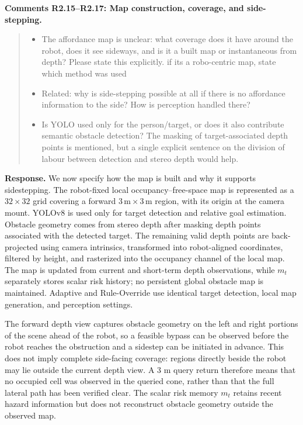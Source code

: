 \documentclass[letterpaper,11pt]{article}
\begin{document}
\noindent\textbf{Comments R2.15--R2.17: Map construction, coverage, and side-stepping.}
\begin{quote}\color{reviewgray}
\begin{itemize}[leftmargin=*,nosep,label={}]
\item[\textbf{R2.15.}] The affordance map is unclear: what coverage does it have around the robot, does it see sideways, and is it a built map or instantaneous from depth? Please state this explicitly. if its a robo-centric map, state which method was used
\item[\textbf{R2.16.}] Related: why is side-stepping possible at all if there is no affordance information to the side? How is perception handled there?
\item[\textbf{R2.17.}] Is YOLO used only for the person/target, or does it also contribute semantic obstacle detection? The masking of target-associated depth points is mentioned, but a single explicit sentence on the division of labour between detection and stereo depth would help.
\end{itemize}
\end{quote}
\noindent\textbf{Response.}
We now specify how the map is built and why it supports sidestepping. The robot-fixed local occupancy--free-space map is represented as a $32\times32$ grid covering a forward $3\,\mathrm{m}\times3\,\mathrm{m}$ region, with its origin at the camera mount. YOLOv8 is used only for target detection and relative goal estimation. Obstacle geometry comes from stereo depth after masking depth points associated with the detected target. The remaining valid depth points are back-projected using camera intrinsics, transformed into robot-aligned coordinates, filtered by height, and rasterized into the occupancy channel of the local map. The map is updated from current and short-term depth observations, while $m_t$ separately stores scalar risk history; no persistent global obstacle map is maintained. Adaptive and Rule-Override use identical target detection, local map generation, and perception settings.

The forward depth view captures obstacle geometry on the left and right portions of the scene ahead of the robot, so a feasible bypass can be observed before the robot reaches the obstruction and a sidestep can be initiated in advance. This does not imply complete side-facing coverage: regions directly beside the robot may lie outside the current depth view. A 3 m query return therefore means that no occupied cell was observed in the queried cone, rather than that the full lateral path has been verified clear. The scalar risk memory $m_t$ retains recent hazard information but does not reconstruct obstacle geometry outside the observed map.
\par\nopagebreak[4]
\end{document}
